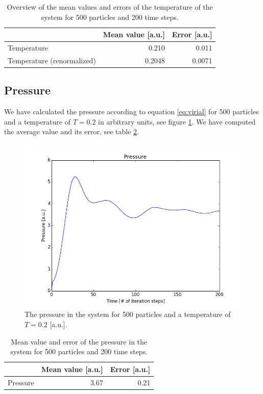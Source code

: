 \documentclass[a4paper,twoside,12pt]{article}
\begin{document}
\begin{table}
\centering
\caption{Overview of the mean values and errors of the temperature of the system for 500 particles and 200 time steps.}
\begin{tabular}{|l|r|r|}
\hline
 & Mean value [a.u.] & Error [a.u.] \\
 \hline
Temperature & 0.210 & 0.011  \\
Temperature (renormalized) & 0.2048 & 0.0071 \\
\hline
\end{tabular}
\label{tab:tem}
\end{table}

\subsection{Pressure}

\noindent We have calculated the pressure according to equation \ref{eq:virial} for 500 particles and a temperature of $T= 0.2$ in arbitrary units, see figure \ref{fig:pres}. We have computed the average value and its error, see table \ref{tab:pres}.

\begin{figure}[h]
\centering
\includegraphics[scale=0.5]{figures/pressure_500.png}
\caption{ The pressure in the system for 500 particles and a temperature of $T=0.2$ [a.u.].}
\label{fig:pres}
\end{figure} 

\begin{table}
\centering
\caption{Mean value and error of the pressure in the system for 500 particles and 200 time steps.}
\begin{tabular}{|l|r|r|}
\hline
 & Mean value [a.u.] & Error [a.u.] \\
 \hline
Pressure & 3.67 & 0.21 \\
\hline
\end{tabular}
\label{tab:pres}
\end{table}
\end{document}
